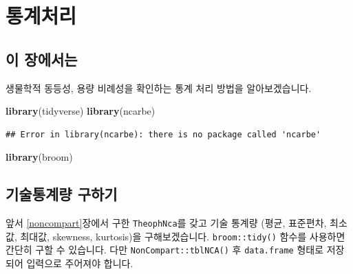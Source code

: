 \documentclass[12pt,]{krantz}
\newenvironment{Shaded}{\begin{snugshade}}{\end{snugshade}}
\newcommand{\KeywordTok}[1]{\textcolor[rgb]{0.13,0.29,0.53}{\textbf{#1}}}
\newcommand{\DataTypeTok}[1]{\textcolor[rgb]{0.13,0.29,0.53}{#1}}
\newcommand{\DecValTok}[1]{\textcolor[rgb]{0.00,0.00,0.81}{#1}}
\newcommand{\StringTok}[1]{\textcolor[rgb]{0.31,0.60,0.02}{#1}}
\newcommand{\OtherTok}[1]{\textcolor[rgb]{0.56,0.35,0.01}{#1}}
\newcommand{\OperatorTok}[1]{\textcolor[rgb]{0.81,0.36,0.00}{\textbf{#1}}}
\newcommand{\NormalTok}[1]{#1}
\theoremstyle{definition}
\theoremstyle{definition}
\theoremstyle{definition}
\theoremstyle{remark}
\begin{document}
\chapter{통계처리}\label{statistics}

\section{이 장에서는}\label{stat-intro}

생물학적 동등성, 용량 비례성을 확인하는 통계 처리 방법을 알아보겠습니다.

\begin{Shaded}
\begin{Highlighting}[]
\KeywordTok{library}\NormalTok{(tidyverse)}
\KeywordTok{library}\NormalTok{(ncarbe)}
\end{Highlighting}
\end{Shaded}

\begin{verbatim}
## Error in library(ncarbe): there is no package called 'ncarbe'
\end{verbatim}

\begin{Shaded}
\begin{Highlighting}[]
\KeywordTok{library}\NormalTok{(broom)}
\end{Highlighting}
\end{Shaded}

\section{기술통계량 구하기}\label{-}

앞서 \ref{noncompart}장에서 구한 \texttt{TheophNca}를 갖고 기술 통계량
(평균, 표준편차, 최소값, 최대값, skewness, kurtosis)을 구해보겠습니다.
\texttt{broom::tidy()} 함수를 사용하면 간단히 구할 수 있습니다. 다만
\texttt{NonCompart::tblNCA()} 후 \texttt{data.frame} 형태로 저장되어
입력으로 주어져야 합니다.

\begin{Shaded}
\end{Shaded}
\end{document}

